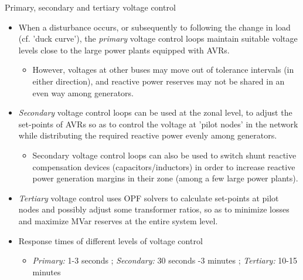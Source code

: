 \begin{frame}[allowframebreaks]{Primary, secondary and tertiary voltage control}
    \begin{itemize}
        \item When a disturbance occurs, or subsequently to following the change in load (cf. 'duck curve'), the \textit{primary} voltage control loops maintain suitable voltage levels close to the large power plants equipped with AVRs.
        \begin{itemize}
            \item However, voltages at other buses may move out of tolerance intervals (in either direction), and reactive power reserves may not be shared in an even way among generators.
        \end{itemize}
        \item \textit{Secondary} voltage control loops can be used at the zonal level, to adjust the set-points of AVRs so as to control the voltage at 'pilot nodes' in the network while distributing the required reactive power evenly among generators.
        \begin{itemize}
            \item Secondary voltage control loops can also be used to switch shunt reactive compensation devices (capacitors/inductors) in order to increase reactive power generation margins in their zone (among a few large power plants).
        \end{itemize}
        \item \textit{Tertiary} voltage control uses OPF solvers to calculate set-points at pilot nodes and possibly adjust some transformer ratios, so as to minimize losses and maximize MVar reserves at the entire system level.
        \item Response times of different levels of voltage control
        \begin{itemize}
            \item \textit{Primary:} 1-3 seconds ; \textit{Secondary:} 30 seconds -3 minutes ; \textit{Tertiary:} 10-15 minutes
        \end{itemize}
    \end{itemize}
\end{frame}
